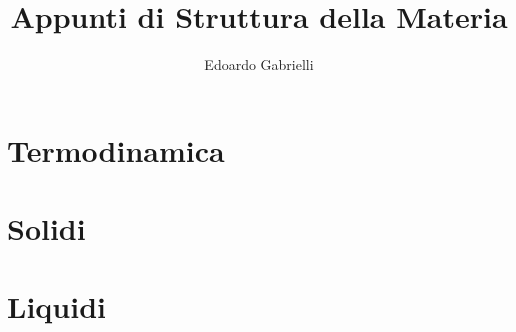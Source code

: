 \documentclass[a4paper]{report}
\author{Edoardo Gabrielli}
\title{Appunti di Struttura della Materia}
\renewcommand{\[}{\begin{equation}}
\renewcommand{\]}{\end{equation}}
\begin{document}
\maketitle
\clearpage
\tableofcontents
\chapter{Termodinamica}
%
%
%
%
%
%
%
%
%
%
%
%
%
%
%
\chapter{Solidi}
%
%
%
\chapter{Liquidi}
%
%
%
%
%
%
%

\end{document}
